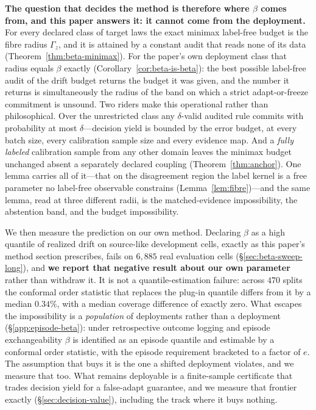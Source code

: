 \documentclass[conference]{IEEEtran}
\theoremstyle{plain}
\theoremstyle{definition}
\begin{document}
\textbf{The question that decides the method is therefore where $\beta$ comes from, and this paper
answers it: it cannot come from the deployment.} For every declared class of target laws the exact
minimax label-free budget is the fibre radius $\Gamma_z$, and it is attained by a constant audit
that reads none of its data (Theorem~\ref{thm:beta-minimax}). For the paper's own deployment class
that radius equals $\beta$ exactly (Corollary~\ref{cor:beta-is-beta}): the best possible label-free
audit of the drift budget returns the budget it was given, and the number it returns is
simultaneously the radius of the band on which a strict adapt-or-freeze commitment is unsound. Two
riders make this operational rather than philosophical. Over the unrestricted class any
$\delta$-valid audited rule commits with probability at most $\delta$---decision yield is bounded by
the error budget, at every batch size, every calibration sample size and every evidence map. And a
\emph{fully labeled} calibration sample from any other domain leaves the minimax budget unchanged
absent a separately declared coupling (Theorem~\ref{thm:anchor}). One lemma carries all of
it---that on the disagreement region the label kernel is a free parameter no label-free observable
constrains (Lemma~\ref{lem:fibre})---and the same lemma, read at three different radii, is the
matched-evidence impossibility, the abstention band, and the budget impossibility.

We then measure the prediction on our own method. Declaring $\beta$ as a high quantile of realized
drift on source-like development cells, exactly as this paper's method section prescribes, fails on
$6{,}885$ real evaluation cells (\S\ref{sec:beta-sweep-long}), and \textbf{we report that negative
result about our own parameter} rather than withdraw it. It is not a quantile-estimation failure:
across $470$ splits the conformal order statistic that replaces the plug-in quantile differs from it
by a median $0.34\%$, with a median coverage difference of exactly zero. What escapes the
impossibility is a \emph{population} of deployments rather than a deployment
(\S\ref{app:episode-beta}): under retrospective outcome logging and episode exchangeability $\beta$
is identified as an episode quantile and estimable by a conformal order statistic, with the episode
requirement bracketed to a factor of $e$. The assumption that buys it is the one a shifted
deployment violates, and we measure that too. What remains deployable is a finite-sample certificate
that trades decision yield for a false-adapt guarantee, and we measure that frontier exactly
(\S\ref{sec:decision-value}), including the track where it buys nothing.
\end{document}
